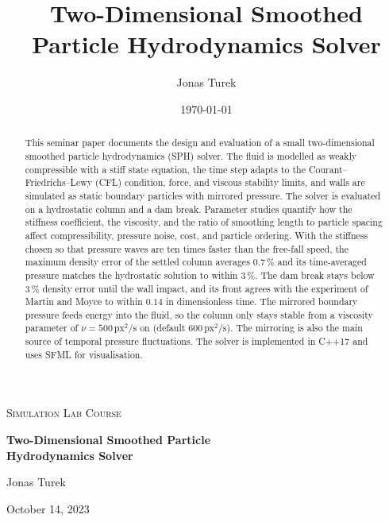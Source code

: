 \documentclass[11pt,a4paper]{article}
\title{Two-Dimensional Smoothed Particle Hydrodynamics Solver}
\author{Jonas Turek}
\date{\today}
\begin{document}
\hypersetup{pageanchor=false}
\begin{titlepage}
  \centering
  \vspace*{2cm}
  {\large\scshape Simulation Lab Course\par}
  \vspace{0.4cm}
  {\large \par}
  \vspace{2.5cm}
  \vspace{0.5cm}
  {\LARGE\bfseries Two-Dimensional Smoothed Particle\\[0.2cm] Hydrodynamics Solver\par}
  \vspace{0.3cm}
  \vspace{1.5cm}
  {\Large Jonas Turek\par}
  \vfill
  \vfill
  {\large October 14, 2023\par}
\end{titlepage}
\hypersetup{pageanchor=true}

\vspace*{\fill}
\renewcommand{\abstractname}{\Large Abstract\vspace{0.3cm}}
\begin{abstract}
\large
This seminar paper documents the design and evaluation of a small two-dimensional
smoothed particle hydrodynamics (SPH) solver. The fluid is modelled as weakly compressible
with a stiff state equation, the time step adapts to the Courant–Friedrichs–Lewy (CFL) condition, force, and viscous
stability limits, and walls are simulated as static boundary particles with
mirrored pressure. The solver is evaluated on a hydrostatic column and a dam
break. Parameter studies quantify how the stiffness coefficient, the viscosity,
and the ratio of smoothing length to particle spacing affect compressibility,
pressure noise, cost, and particle ordering. With the stiffness chosen so that
pressure waves are ten times faster than the free-fall speed, the maximum
density error of the settled column averages $0.7\,\%$ and its time-averaged
pressure matches the hydrostatic solution to within $3\,\%$. The dam break stays
below $3\,\%$ density error until the wall impact, and its front agrees with the
experiment of Martin and Moyce to within $0.14$ in dimensionless time. The
mirrored boundary pressure feeds energy into the fluid, so the column only stays
stable from a viscosity parameter of \mbox{$\nu = 500\,\mathrm{px^2/s}$} on
(default \mbox{$600\,\mathrm{px^2/s}$}). The mirroring is also the main source of
temporal pressure fluctuations. The solver is implemented in C++17 and uses SFML for visualisation.
\end{abstract}
\vspace*{\fill}
\newpage
\tableofcontents
\newpage





\clearpage



\end{document}

